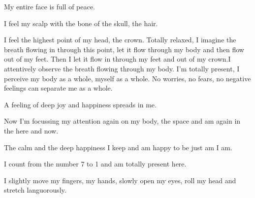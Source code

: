 \documentclass[12pt]{article}
\begin{document}
\vspace{6mm}
My entire face is full of peace.

\vspace{6mm}
I feel my scalp with the bone of the skull, the hair.

\vspace{6mm}
I feel the highest point of my head, the crown. Totally relaxed, I imagine the breath flowing in through this point, let it flow through my body and then flow out of my feet. Then I let it flow in through my feet and out of my crown.I attentively observe the breath flowing through my body. I'm totally present, I perceive my body as a whole, myself as a whole. No worries, no fears, no negative feelings can separate me as a whole. 

\vspace{6mm}
A feeling of deep joy and happiness spreads in me.

\vspace{6mm}
Now I'm focussing my attention again on my body, the space and am again in the here and now.

The calm and the deep happiness I keep and am happy to be just am I am.

\vspace{6mm}
I count from the number 7 to 1 and am totally present here.

I slightly move my fingers, my hands, slowly open my eyes, roll my head and stretch languorously. 
\end{document}
